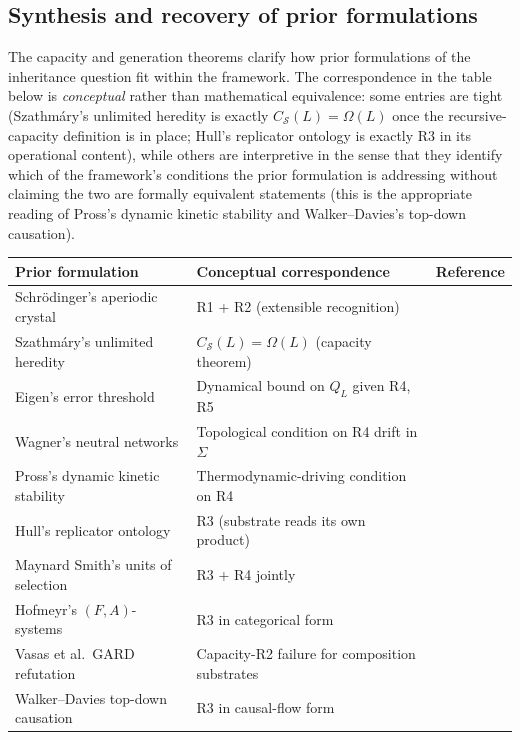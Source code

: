 \documentclass[11pt]{article}
\theoremstyle{plain}
\theoremstyle{definition}
\newcommand{\Csub}{C_{\mathcal{S}}}
\begin{document}
\subsection{Synthesis and recovery of prior formulations}
\label{subsec:synthesis}

The capacity and generation theorems clarify how prior formulations of the inheritance question fit within the framework. The correspondence in the table below is \emph{conceptual} rather than mathematical equivalence: some entries are tight (Szathm\'ary's unlimited heredity is exactly $\Csub(L) = \Omega(L)$ once the recursive-capacity definition is in place; Hull's replicator ontology is exactly R3 in its operational content), while others are interpretive in the sense that they identify which of the framework's conditions the prior formulation is addressing without claiming the two are formally equivalent statements (this is the appropriate reading of Pross's dynamic kinetic stability and Walker--Davies's top-down causation).

\begin{center}
\begin{tabular}{lll}
\toprule
Prior formulation & Conceptual correspondence & Reference \\
\midrule
Schr\"odinger's aperiodic crystal & R1 + R2 (extensible recognition) & \citep{Schrodinger1944} \\
Szathm\'ary's unlimited heredity & $\Csub(L) = \Omega(L)$ (capacity theorem) & \citep{Szathmary2000} \\
Eigen's error threshold & Dynamical bound on $Q_L$ given R4, R5 & \citep{Eigen1971, EigenMcCaskillSchuster1989} \\
Wagner's neutral networks & Topological condition on R4 drift in $\Sigma$ & \citep{Wagner2005, Wagner2011} \\
Pross's dynamic kinetic stability & Thermodynamic-driving condition on R4 & \citep{Pross2011} \\
Hull's replicator ontology & R3 (substrate reads its own product) & \citep{Hull1980} \\
Maynard Smith's units of selection & R3 + R4 jointly & \citep{MaynardSmith2000} \\
Hofmeyr's $(F, A)$-systems & R3 in categorical form & \citep{Hofmeyr2017} \\
Vasas et al.\ GARD refutation & Capacity-R2 failure for composition substrates & \citep{Vasas2010} \\
Walker--Davies top-down causation & R3 in causal-flow form & \citep{WalkerDavies2013} \\
\bottomrule
\end{tabular}
\end{center}
\end{document}
